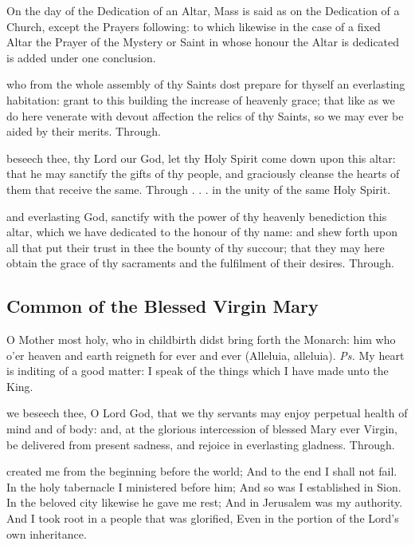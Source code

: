 \begin{rubric}
	On the day of the Dedication of an Altar, Mass is said as on the Dedication of a Church, except the Prayers following: to which likewise in the case of a fixed Altar the Prayer of the Mystery or Saint in whose honour the Altar is dedicated is added under one conclusion.
\end{rubric}

\collect
{} who from the whole assembly of thy Saints dost prepare for thyself an everlasting habitation: grant to this building the increase of heavenly grace; that like as we do here venerate with devout affection the relics of thy Saints, so we may ever be aided by their merits. Through.

\clearpage
\secret
{} beseech thee, thy Lord our God, let thy Holy Spirit come down upon this altar: that he may sanctify the gifts of thy people, and graciously cleanse the hearts of them that receive the same. Through . . . in the unity of the same Holy Spirit.

\postcommunion
{} and everlasting God, sanctify with the power of thy heavenly benediction this altar, which we have dedicated to the honour of thy name: and shew forth upon all that put their trust in thee the bounty of thy succour; that they may here obtain the grace of thy sacraments and the fulfilment of their desires. Through.


\subsection{Common of the Blessed Virgin Mary}\label{CommonBVM}

\introit
{} O Mother most holy, who in childbirth didst bring forth the Monarch: him who o'er heaven and earth reigneth for ever and ever (Alleluia, alleluia). \textit{Ps.} My heart is inditing of a good matter: I speak of the things which I have made unto the King.

\collect
{} we beseech thee, O Lord God, that we thy servants may enjoy perpetual health of mind and of body: and, at the glorious intercession of blessed Mary ever Virgin, be delivered from present sadness, and rejoice in everlasting gladness. Through.

 created me from the beginning before the world; And to the end I shall not fail. In the holy tabernacle I ministered before him; And so was I established in Sion. In the beloved city likewise he gave me rest; And in Jerusalem was my authority. And I took root in a people that was glorified, Even in the portion of the Lord’s own inheritance. 

